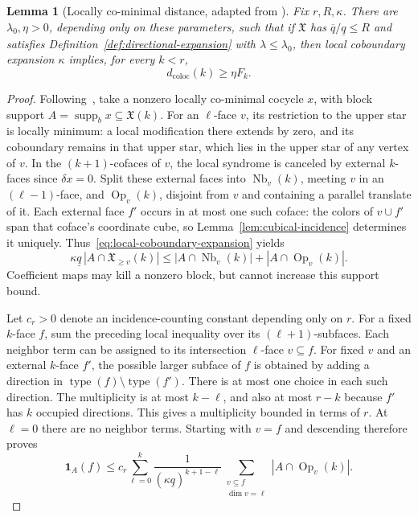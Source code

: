 \documentclass[11pt,letterpaper]{article}
\renewcommand{\le}{\leqslant}
\renewcommand{\ge}{\geqslant}
\newtheorem{lemma}[theorem]{Lemma}
\theoremstyle{definition}
\theoremstyle{remark}
\newcommand{\X}{\mathfrak{X}}
\newcommand{\supp}{\operatorname{supp}}
\newcommand{\one}{\mathbf 1}
\newcommand{\coloc}{\operatorname{coloc}}
\newcommand{\minus}{\setminus}
\begin{document}
\begin{lemma}[Locally co-minimal distance, adapted from {\cite[Proposition~7.1]{DinurLinVidick2024}}]\label{lem:global}
Fix $r,R,\kappa$. There are $\lambda_0,\eta>0$, depending only on
these parameters, such that if $\X$ has $\overline q/\underline q\le R$ and satisfies
Definition~\ref{def:directional-expansion} with $\lambda\le\lambda_0$, then local coboundary
expansion $\kappa$ implies, for every $k<r$,
\begin{equation}
 d_{\coloc}(k)\ge\eta F_k.
 \label{eq:coloc-bound}
\end{equation}
\end{lemma}
\begin{proof}
Following~\cite[Claims~7.4--7.6]{DinurLinVidick2024}, take a nonzero
locally co-minimal cocycle $x$, with block support
$A=\supp_b x\subseteq \X(k)$.
For an $\ell$-face $v$, its restriction to the upper star is locally
minimum: a local modification there extends by zero, and its
coboundary remains in that upper star, which lies in the upper star
of any vertex of $v$. In the $(k+1)$-cofaces of $v$, the local
syndrome is canceled by external $k$-faces since $\delta x=0$.
Split these external faces into $\operatorname{Nb}_v(k)$, meeting
$v$ in an $(\ell-1)$-face, and $\operatorname{Op}_v(k)$, disjoint
from $v$ and containing a parallel translate of it. Each external
face $f'$ occurs in at most one such coface: the colors of $v\cup f'$
span that coface's coordinate cube, so
Lemma~\ref{lem:cubical-incidence} determines it uniquely.
Thus~\eqref{eq:local-coboundary-expansion} yields
\begin{equation*}
 \kappa\underline q\,|A\cap \X_{\ge v}(k)|
 \le |A\cap\operatorname{Nb}_v(k)|+
 |A\cap\operatorname{Op}_v(k)|.
\end{equation*}
Coefficient maps may kill a nonzero block, but cannot increase this
support bound.

Let $c_r>0$ denote an incidence-counting constant depending only on
$r$. For a fixed $k$-face $f$, sum the preceding local inequality over its
$(\ell+1)$-subfaces. Each neighbor term can be assigned to its
intersection $\ell$-face $v\subseteq f$. For fixed $v$ and an external
$k$-face $f'$, the possible larger subface of $f$ is obtained by
adding a direction in $\operatorname{type}(f)\minus
\operatorname{type}(f')$. There is at most one choice in each such
direction. The multiplicity is at most $k-\ell$, and also at most
$r-k$ because $f'$ has $k$ occupied directions. This gives
a multiplicity bounded in terms of $r$. At $\ell=0$
there are no neighbor terms. Starting with $v=f$ and descending
therefore proves
\begin{equation*}
 \one_A(f)\le c_r
 \sum_{\ell=0}^k\frac{1}{(\kappa\underline q)^{k+1-\ell}}
 \sum_{\substack{v\subseteq f\\\dim v=\ell}}
 |A\cap\operatorname{Op}_v(k)|.
\end{equation*}


\end{proof}
\end{document}

